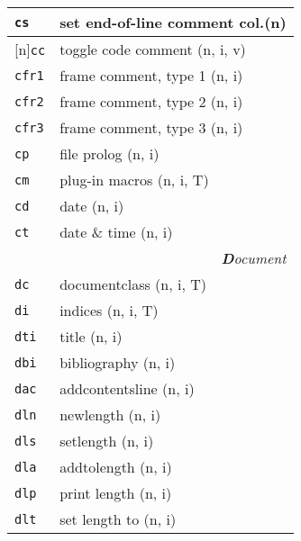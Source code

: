 \documentclass[oneside,10pt,landscape,DIV16]{scrartcl}
\newcommand{\Rep}{{\scriptsize{[n]}}}
\newcommand{\Map}[1] {\textbf{\textasciiacute}\texttt{#1}}
\begin{document}
\begin{multicols}{3}
\begin{center}
\begin{tabular}[]{|p{11mm}|p{60mm}|}
\hline     \Map{cs}   & set end-of-line comment col.\hfill (n)      \\
%
\hline \Rep\Map{cc}   & toggle code comment         \hfill (n, i, v)\\
%
\hline     \Map{cfr1} & frame comment, type 1       \hfill (n, i)   \\
\hline     \Map{cfr2} & frame comment, type 2       \hfill (n, i)   \\
\hline     \Map{cfr3} & frame comment, type 3       \hfill (n, i)   \\
\hline     \Map{cp}   & file prolog                 \hfill (n, i)   \\
\hline     \Map{cm}   & plug-in macros              \hfill (n, i, T)\\
\hline     \Map{cd}   & date                        \hfill (n, i)   \\
\hline     \Map{ct}   & date \& time                \hfill (n, i)   \\
\hline
\hline
\multicolumn{2}{|r|}{\textsl{\textbf{D}ocument}}                 \\[1.0ex]
\hline     \Map{dc}  &  documentclass               \hfill (n, i, T)\\
\hline     \Map{di}  &  indices                     \hfill (n, i, T)\\
\hline     \Map{dti} &  title                       \hfill (n, i)\\
\hline     \Map{dbi} &  bibliography                \hfill (n, i)\\
\hline     \Map{dac} &  addcontentsline             \hfill (n, i)\\
\hline
\hline     \Map{dln} &  newlength                   \hfill (n, i)\\
\hline     \Map{dls} &  setlength                   \hfill (n, i)\\
\hline     \Map{dla} &  addtolength                 \hfill (n, i)\\
\hline     \Map{dlp} &  print length                \hfill (n, i)\\
\hline     \Map{dlt} &  set length to               \hfill (n, i)\\
\hline
%
\end{tabular}\\
%

\end{center}
\end{multicols}
\end{document}
